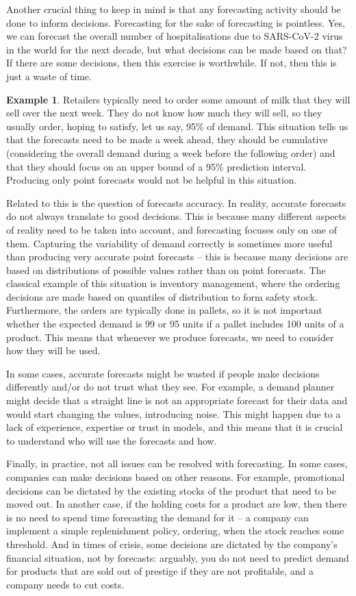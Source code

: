 \documentclass[]{book}
\theoremstyle{definition}
\theoremstyle{definition}
\newtheorem{example}{Example}[chapter]
\theoremstyle{definition}
\theoremstyle{definition}
\theoremstyle{remark}
\begin{document}
Another crucial thing to keep in mind is that any forecasting activity should be done to inform decisions. Forecasting for the sake of forecasting is pointless. Yes, we can forecast the overall number of hospitalisations due to SARS-CoV-2 virus in the world for the next decade, but what decisions can be made based on that? If there are some decisions, then this exercise is worthwhile. If not, then this is just a waste of time.

\begin{example}
Retailers typically need to order some amount of milk that they will sell over the next week. They do not know how much they will sell, so they usually order, hoping to satisfy, let us say, 95\% of demand. This situation tells us that the forecasts need to be made a week ahead, they should be cumulative (considering the overall demand during a week before the following order) and that they should focus on an upper bound of a 95\% prediction interval. Producing only point forecasts would not be helpful in this situation.
\end{example}

Related to this is the question of forecasts accuracy. In reality, accurate forecasts do not always translate to good decisions. This is because many different aspects of reality need to be taken into account, and forecasting focuses only on one of them. Capturing the variability of demand correctly is sometimes more useful than producing very accurate point forecasts -- this is because many decisions are based on distributions of possible values rather than on point forecasts. The classical example of this situation is inventory management, where the ordering decisions are made based on quantiles of distribution to form safety stock. Furthermore, the orders are typically done in pallets, so it is not important whether the expected demand is 99 or 95 units if a pallet includes 100 units of a product. This means that whenever we produce forecasts, we need to consider how they will be used.

In some cases, accurate forecasts might be wasted if people make decisions differently and/or do not trust what they see. For example, a demand planner might decide that a straight line is not an appropriate forecast for their data and would start changing the values, introducing noise. This might happen due to a lack of experience, expertise or trust in models, and this means that it is crucial to understand who will use the forecasts and how.

Finally, in practice, not all issues can be resolved with forecasting. In some cases, companies can make decisions based on other reasons. For example, promotional decisions can be dictated by the existing stocks of the product that need to be moved out. In another case, if the holding costs for a product are low, then there is no need to spend time forecasting the demand for it -- a company can implement a simple replenishment policy, ordering, when the stock reaches some threshold. And in times of crisis, some decisions are dictated by the company's financial situation, not by forecasts: arguably, you do not need to predict demand for products that are sold out of prestige if they are not profitable, and a company needs to cut costs.
\end{document}
